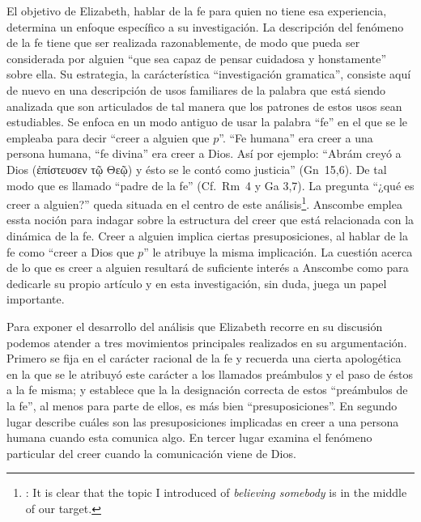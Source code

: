 El objetivo de Elizabeth, hablar de la fe para quien no tiene esa experiencia, determina un enfoque específico a su investigación. La descripción del fenómeno de la fe tiene que ser realizada razonablemente, de modo que pueda ser considerada por alguien \enquote{que sea capaz de pensar cuidadosa y honstamente} sobre ella. Su estrategia, la carácterística \enquote{investigación gramatica}, consiste aquí de nuevo en una descripción de usos familiares de la palabra que está siendo analizada que son articulados de tal manera que los patrones de estos usos sean estudiables\autocite[Cf.~][12]{bakerhacker2009understanding}. Se enfoca en un modo antiguo de usar la palabra \enquote{fe} en el que se le empleaba para decir \enquote{creer a alguien que $p$}. \enquote{Fe humana} era creer a una persona humana, \enquote{fe divina} era creer a Dios\autocite[Cf.~][2]{anscombe2008faith:tobelieve}. Así por ejemplo: \enquote{Abrám creyó a Dios (\textgreek{ἐπίστευσεν τῷ Θεῷ}) y ésto se le contó como justicia} (Gn~15,6). De tal modo que es llamado \enquote{padre de la fe} (Cf.~Rm~4 y Ga 3,7). La pregunta \enquote{¿qué es creer a alguien?} queda situada en el centro de este análisis\footnote{\cite[Cf.~][116]{anscombe1981erp:faith}: It is clear that the topic I introduced of \emph{believing somebody} is in the middle of our target.}. Anscombe emplea essta noción para indagar sobre la estructura del creer que está relacionada con la dinámica de la fe. Creer a alguien implica ciertas presuposiciones, al hablar de la fe como \enquote{creer a Dios que $p$} le atribuye la misma implicación. La cuestión acerca de lo que es creer a alguien resultará de suficiente interés a Anscombe como para dedicarle su propio artículo y en esta investigación, sin duda, juega un papel importante.

Para exponer el desarrollo del análisis que Elizabeth recorre en su discusión podemos atender a tres movimientos principales realizados en su argumentación. Primero se fija en el carácter racional de la fe y recuerda una cierta apologética en la que se le atribuyó este carácter a los llamados preámbulos y el paso de éstos a la fe misma; y establece que la la designación correcta de estos \enquote{preámbulos de la fe}, al menos para parte de ellos, es más bien \enquote{presuposiciones}. En segundo lugar describe cuáles son las presuposiciones implicadas en creer a una persona humana cuando esta comunica algo. En tercer lugar examina el fenómeno particular del creer cuando la comunicación viene de Dios.

